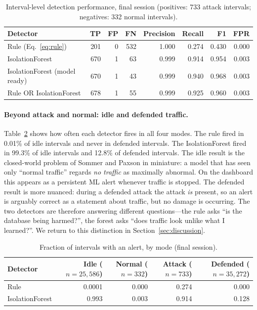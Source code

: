\begin{table}[t]
\centering
\caption{Interval-level detection performance, final session (positives: 733 attack
intervals; negatives: 332 normal intervals).}
\label{tab:tick}
\small
\begin{tabular}{@{}lrrrrrrr@{}}
\toprule
Detector & TP & FP & FN & Precision & Recall & F1 & FPR \\
\midrule
Rule (Eq.~\ref{eq:rule}) & 201 & 0 & 532 & 1.000 & 0.274 & 0.430 & 0.000 \\
IsolationForest & 670 & 1 & 63 & 0.999 & 0.914 & 0.954 & 0.003 \\
IsolationForest (model ready) & 670 & 1 & 43 & 0.999 & 0.940 & 0.968 & 0.003 \\
Rule OR IsolationForest & 678 & 1 & 55 & 0.999 & 0.925 & 0.960 & 0.003 \\
\bottomrule
\end{tabular}
\end{table}

\paragraph{Beyond attack and normal: idle and defended traffic.} Table~\ref{tab:alertrates}
shows how often each detector fires in all four modes. The rule fired in 0.01\% of
idle intervals and never in defended intervals. The IsolationForest fired in 99.3\% of
idle intervals and 12.8\% of defended intervals. The idle result is the closed-world
problem of Sommer and Paxson \cite{sommer2010} in miniature: a model that has seen only
``normal traffic'' regards \emph{no traffic} as maximally abnormal. On the dashboard
this appears as a persistent ML alert whenever traffic is stopped. The defended result
is more nuanced: during a defended attack the attack \emph{is} present, so an alert is
arguably correct as a statement about traffic, but no damage is occurring. The two
detectors are therefore answering different questions---the rule asks ``is the
database being harmed?'', the forest asks ``does traffic look unlike what I learned?''.
We return to this distinction in Section~\ref{sec:discussion}.

\begin{table}[t]
\centering
\caption{Fraction of intervals with an alert, by mode (final session).}
\label{tab:alertrates}
\small
\begin{tabular}{@{}lrrrr@{}}
\toprule
Detector & Idle ($n=25{,}586$) & Normal ($n=332$) & Attack ($n=733$) & Defended ($n=35{,}272$) \\
\midrule
Rule & 0.0001 & 0.000 & 0.274 & 0.000 \\
IsolationForest & 0.993 & 0.003 & 0.914 & 0.128 \\
\bottomrule
\end{tabular}
\end{table}

